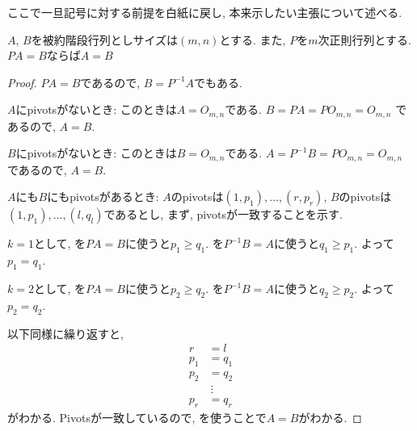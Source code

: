 ここで一旦記号に対する前提を白紙に戻し,
本来示したい主張について述べる.
\begin{theorem}
  $A$, $B$を被約階段行列としサイズは$(m,n)$とする.
  また, $P$を$m$次正則行列とする.
  $PA=B$ならば$A=B$
\end{theorem}
\begin{proof}
  $PA=B$であるので, $B=P^{-1}A$でもある.
  
  $A$にpivotsがないとき:
  このときは$A=O_{m,n}$である.
  $B=PA=PO_{m,n}=O_{m,n}$
  であるので, $A=B$.

  $B$にpivotsがないとき:
  このときは$B=O_{m,n}$である.
  $A=P^{-1}B=PO_{m,n}=O_{m,n}$
  であるので, $A=B$.

  $A$にも$B$にもpivotsがあるとき:
  $A$のpivotsは$(1,p_1),\ldots,(r,p_r)$,
  $B$のpivotsは$(1,p_1),\ldots,(l,q_l)$であるとし,
  まず, pivotsが一致することを示す.
  
  $k=1$として,
  を$PA=B$に使うと$p_1\geq q_1$.
  を$P^{-1}B=A$に使うと$q_1\geq p_1$.
  よって$p_1=q_1$.

  $k=2$として,
  を$PA=B$に使うと$p_2\geq q_2$.
  を$P^{-1}B=A$に使うと$q_2\geq p_2$.
  よって$p_2=q_2$.

  以下同様に繰り返すと,
  \begin{align*}
    r&=l\\
    p_1&=q_1\\
    p_2&=q_2\\
    &\ \vdots\\
    p_r&=q_r
  \end{align*}
  がわかる.
  Pivotsが一致しているので,
  を使うことで$A=B$がわかる.
\end{proof}
